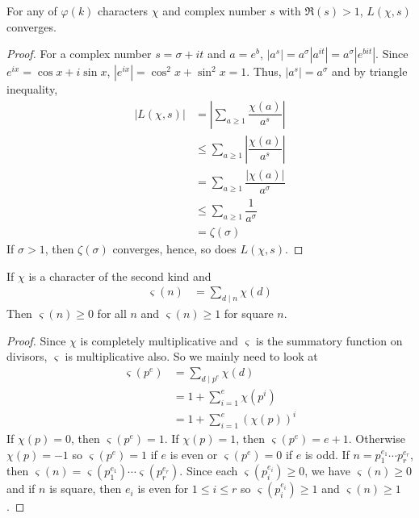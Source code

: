 \documentclass[elemannt.tex]{subfile}
\begin{document}
		\begin{proposition}
			For any of $\varphi(k)$ characters $\chi$ and complex number $s$ with $\mathfrak{R}(s)>1$, $L(\chi, s)$ converges.
		\end{proposition}

		\begin{proof}
			For a complex number $s=\sigma+it$ and $a=e^{b}$, $|a^{s}|=a^{\sigma}|a^{it}|=a^{\sigma}|e^{bit}|$. Since $e^{ix}=\cos{x}+i\sin{x}$, $|e^{ix}|=\cos^{2}{x}+\sin^{2}{x}=1$. Thus, $|a^{s}|=a^{\sigma}$ and by triangle inequality,
				\begin{align*}
					|L(\chi,s)|
						& = \left|\sum_{a\geq 1}\dfrac{\chi(a)}{a^{s}}\right|\\
						& \leq \sum_{a\geq 1}\left|\dfrac{\chi(a)}{a^{s}}\right|\\
						& = \sum_{a\geq 1}\dfrac{|\chi(a)|}{a^{\sigma}}\\
						& \leq \sum_{a\geq 1}\dfrac{1}{a^{\sigma}}\\
						& = \zeta(\sigma)
				\end{align*}
			If $\sigma > 1$, then $\zeta(\sigma)$ converges, hence, so does $L(\chi, s)$.
		\end{proof}

		\begin{proposition}\label{pro:second-char-geq1}
			If $\chi$ is a character of the second kind and
				\begin{align*}
					\varsigma(n)
						& = \sum_{d\mid n}\chi(d)
				\end{align*}
			Then $\varsigma(n)\geq 0$ for all $n$ and $\varsigma(n)\geq 1$ for square $n$.
		\end{proposition}

		\begin{proof}
			Since $\chi$ is completely multiplicative and $\varsigma$ is the summatory function on divisors, $\varsigma$ is multiplicative also. So we mainly need to look at
				\begin{align*}
					\varsigma(p^{e})
						& = \sum_{d\mid p^{e}}\chi(d)\\
						& = 1+\sum_{i=1}^{e}\chi(p^{i})\\
						& = 1+\sum_{i=1}^{e}(\chi(p))^{i}
				\end{align*}
			If $\chi(p)=0$, then $\varsigma(p^{e})=1$. If $\chi(p)=1$, then $\varsigma(p^{e})=e+1$. Otherwise $\chi(p)=-1$ so $\varsigma(p^{e})=1$ if $e$ is even or $\varsigma(p^{e})=0$ if $e$ is odd. If $n=p_{1}^{e_{1}}\cdots p_{r}^{e_{r}}$, then $\varsigma(n)=\varsigma(p_{1}^{e_{1}})\cdots\varsigma(p_{r}^{e_{r}})$. Since each $\varsigma(p_{i}^{e_{i}})\geq0$, we have $\varsigma(n)\geq0$ and if $n$ is square, then $e_{i}$ is even for $1\leq i\leq r$ so $\varsigma(p_{i}^{e_{i}})\geq 1$ and $\varsigma(n)\geq1$.
		\end{proof}
\end{document}
